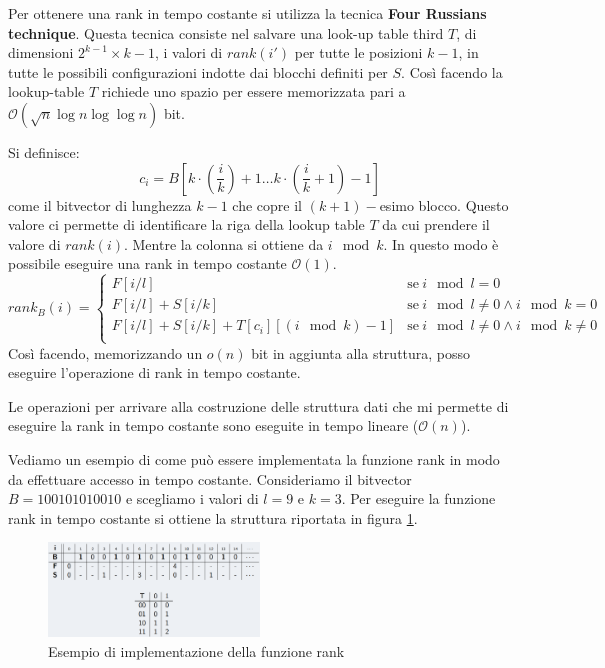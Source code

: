 Per ottenere una rank in tempo costante si utilizza la tecnica \textbf{Four
    Russians technique}. Questa tecnica consiste nel salvare una look-up table
third $T$, di dimensioni $2^{k - 1} \times k - 1$, i valori di $rank(i')$
per tutte le posizioni $k - 1$, in tutte le possibili configurazioni indotte dai
blocchi definiti per $S$. Così facendo la lookup-table $T$ richiede uno spazio
per essere memorizzata pari a $\mathcal{O}(\sqrt{n} \log n \log \log n)$ bit.

Si definisce:
\begin{equation}
    c_i = B \left[k \cdot \left(\frac{i}{k}\right) + 1 \dots k \cdot \left(\frac{i}{k} 
    + 1\right) - 1\right]
\end{equation}
come il bitvector di lunghezza $k - 1$ che copre il $(k + 1)-$esimo blocco. Questo
valore ci permette di identificare la riga della lookup table $T$ da cui prendere
il valore di $rank(i)$. Mentre la colonna si ottiene da $i \mod k$. In questo
modo è possibile eseguire una rank in tempo costante $\mathcal{O}(1)$.
\begin{equation}
    rank_B(i) = \begin{cases}
        F[i/l]                                   & \text{se} \ i \mod l = 0    \\
        F[i/l] + S[i/k]                          & \text{se} \ i \mod l \neq 0
        \land i \mod k = 0                                                     \\
        F[i/l] + S[i/k] + T[c_i][(i \mod k) - 1] & \text{se} \ i \mod l \neq 0
        \land i \mod k \neq 0                                                  \\
    \end{cases}
\end{equation}
Così facendo, memorizzando un $o(n)$ bit in aggiunta alla struttura, posso
eseguire l'operazione di rank in tempo costante.
\begin{nota}
    Le operazioni per arrivare alla costruzione delle struttura dati che mi
    permette di eseguire la rank in tempo costante sono eseguite in tempo lineare
    ($\mathcal{O}(n)$).
\end{nota}
\begin{esempio}
    Vediamo un esempio di come può essere implementata la funzione rank in modo
    da effettuare accesso in tempo costante. Consideriamo il bitvector
    $B = 100101010010$ e scegliamo i valori di $l = 9$ e $k = 3$. Per eseguire
    la funzione rank in tempo costante si ottiene la struttura riportata in
    figura \ref{fig:rank}.
    \begin{figure}[!ht]
        \centering
        \includegraphics[width=0.5\textwidth]{img/Strutture Dati/rank.png}
        \caption{Esempio di implementazione della funzione rank}
        \label{fig:rank}
    \end{figure}
\end{esempio}
